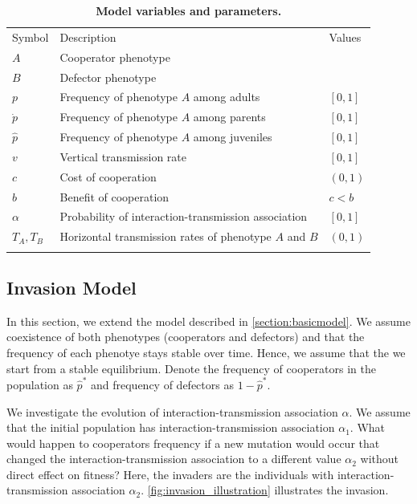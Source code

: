 \documentclass[12pt]{extarticle}
\begin{document}
\begin{table}[p]
\centering
\caption{\textbf{Model variables and parameters.}
}
\begin{tabular}{lll}
\toprule
Symbol & Description & Values \\ \cmidrule(r){1-3}
$A$ & Cooperator phenotype & \\
$B$ & Defector phenotype & \\
$p$ & Frequency of phenotype $A$ among adults & $[0,1]$ \\
$\dot p$ & Frequency of phenotype $A$ among parents & $[0,1]$ \\
$\hat p$ & Frequency of phenotype $A$ among juveniles & $[0,1]$ \\
$v$ & Vertical transmission rate & $[0,1]$ \\
$c$ & Cost of cooperation & $(0,1)$ \\
$b$ & Benefit of cooperation & $c<b$ \\
$\alpha$ & Probability of interaction-transmission association & $[0,1]$ \\
$T_A, T_B$ & Horizontal transmission rates of phenotype $A$ and $B$ & $(0,1)$ \\
\\ \bottomrule
\end{tabular}
\label{table:vars_params}
\end{table}

\subsection{Invasion Model}
In this section, we extend the model described in \autoref{section:basicmodel}. 
We assume coexistence of both phenotypes (cooperators and defectors) and that the frequency of each phenotye stays stable over time.
Hence, we assume that the we start from a stable equilibrium. Denote the frequency of cooperators in the population as $\hat{p}^*$ and frequency of defectors as $1-\hat{p}^*$.

We investigate the evolution of interaction-transmission association $\alpha$.
We assume that the initial population has interaction-transmission association $\alpha_1$. 
What would happen to cooperators frequency if a new mutation would occur that changed the interaction-transmission association to a different value $\alpha_2$ without direct effect on fitness?
Here, the invaders are the individuals with interaction-transmission association $\alpha_2$. \autoref{fig:invasion_illustration} illustrates the invasion.
\end{document}
